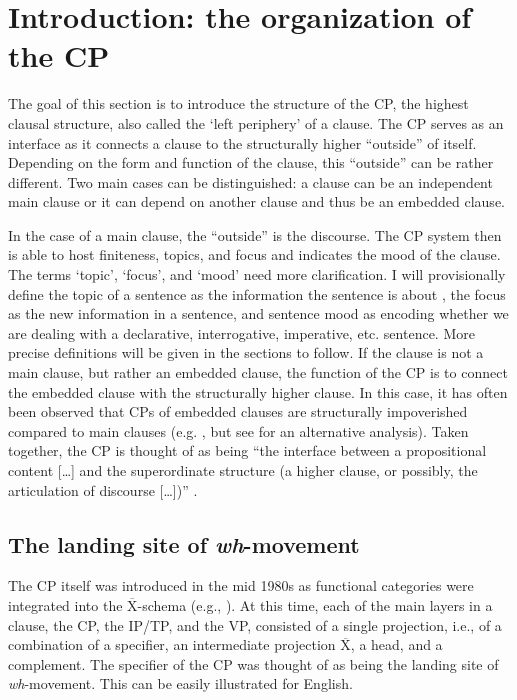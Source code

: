 \section{Introduction: the organization of the CP}\label{introcpchapter}
The goal of this section is to introduce the structure of the CP, the highest clausal structure, also called the `left periphery' of a clause. The CP serves as an interface as it connects a clause to the structurally higher ``outside'' of itself. Depending on the form and function of the clause, this ``outside'' can be rather different. Two main cases can be distinguished: a clause can be an independent main clause or it can depend on another clause and thus be an embedded clause.

In the case of a main clause, the ``outside'' is the discourse. The CP system then is able to host finiteness, topics, and focus and indicates the mood of the clause. The terms `topic', `focus', and `mood' need more clarification. I will provisionally define the topic of a sentence as the information the sentence is about \citep{reinhart1981pragmatics}, the focus as the new information in a sentence, and sentence mood as encoding whether we are dealing with a declarative, interrogative, imperative, etc. sentence. More precise definitions will be given in the sections to follow. If the clause is not a main clause, but rather an embedded clause, the function of the CP is to connect the embedded clause with the structurally higher clause. In this case, it has often been observed that CPs of embedded clauses are structurally impoverished compared to main clauses (e.g. \citealt{haegeman2003conditional}, but see \citealt{haegeman2013syntax} for an alternative analysis). Taken together, the CP is thought of as being ``the interface between a propositional content [\dots ] and the superordinate structure (a higher clause, or possibly, the articulation of discourse [\dots ])'' \citep[283]{rizzi1997fine}.

\subsection{The landing site of \textit{wh}-movement}

The CP itself was introduced in the mid 1980s as functional categories were integrated into the $\overline{\textrm{X}}$-schema (e.g., \citealt{chomsky1986barr, speas1986ecifiers}). At this time, each of the main layers in a clause, the CP, the IP/TP, and the VP, consisted of a single projection, i.e., of a combination of a specifier, an intermediate projection $\overline{\textrm{X}}$, a head, and a complement. The specifier of the CP was thought of as being the landing site of \textit{wh}-movement. This can be easily illustrated for English.

